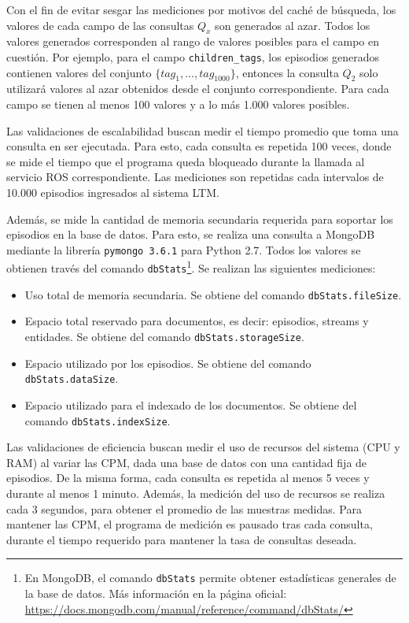 Con el fin de evitar sesgar las mediciones por motivos del caché de búsqueda, los valores de cada campo de las consultas $Q_x$ son generados al azar.  Todos los valores generados corresponden al rango de valores posibles para el campo en cuestión. Por ejemplo, para el campo \texttt{children\_tags}, los episodios generados contienen valores del conjunto $\{ tag_1,\ldots, tag_{1000} \}$, entonces la consulta $Q_2$ solo utilizará valores al azar obtenidos desde el conjunto correspondiente. Para cada campo se tienen al menos 100 valores y a lo más 1.000 valores posibles.

Las validaciones de escalabilidad buscan medir el tiempo promedio que toma una consulta en ser ejecutada. Para esto, cada consulta es repetida 100 veces, donde se mide el tiempo que el programa queda bloqueado durante la llamada al servicio ROS correspondiente. Las mediciones son repetidas cada intervalos de 10.000 episodios ingresados al sistema LTM.

Además, se mide la cantidad de memoria secundaria requerida para soportar los episodios en la base de datos. Para esto, se realiza una consulta a MongoDB mediante la librería \texttt{pymongo 3.6.1} para Python 2.7. Todos los valores se obtienen través del comando \texttt{dbStats}\footnote{En MongoDB, el comando \texttt{dbStats} permite obtener estadísticas generales de la base de datos. Más información en la página oficial: \url{https://docs.mongodb.com/manual/reference/command/dbStats/}}. Se realizan las siguientes mediciones:
\begin{itemize}
\item Uso total de memoria secundaria. Se obtiene del comando \texttt{dbStats.fileSize}.
\item Espacio total reservado para documentos, es decir: episodios, streams y entidades. Se obtiene del comando \texttt{dbStats.storageSize}.
\item Espacio utilizado por los episodios. Se obtiene del comando \texttt{dbStats.dataSize}.
\item Espacio utilizado para el indexado de los documentos. Se obtiene del comando \texttt{dbStats.indexSize}.
\end{itemize}

Las validaciones de eficiencia buscan medir el uso de recursos del sistema (CPU y RAM) al variar las CPM, dada una base de datos con una cantidad fija de episodios. De la misma forma, cada consulta es repetida al menos 5 veces y durante al menos 1 minuto. Además, la medición del uso de recursos se realiza cada 3 segundos, para obtener el promedio de las muestras medidas. Para mantener las CPM, el programa de medición es pausado tras cada consulta, durante el tiempo requerido para mantener la tasa de consultas deseada.

